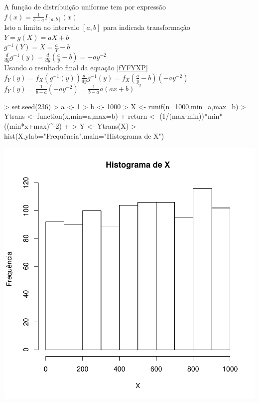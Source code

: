 \documentclass{article}
\begin{document}
  A função de distribuição uniforme tem por expressão\\
  
  $f(x) = \frac{1}{b-a}I_{[a,b]}(x)$\\
  
  Isto a limita ao intervalo $[a,b]$ para indicada transformação\\
  
  $Y = g(X) = aX+b$\\
  
  $g^{-1}(Y) = X = \frac{a}{Y}-b$\\
  
  $\frac{d}{dy}g^{-1}(y) = \frac{d}{dy}(\frac{a}{y}-b) = -ay^{-2}$\\
  
  Usando o resultado final da equação \ref{fYFYXP}\\
  
  $f_Y(y) = f_X(g^{-1}(y))\frac{d}{dy}g^{-1}(y) = f_X(\frac{a}{y}-b)(-ay^{-2})$\\
  
  $f_Y(y) = \frac{1}{b-a}(-ay^{-2}) = \frac{1}{b-a}a(ax+b)^{-2}$
  
\begin{Schunk}
\begin{Sinput}
> set.seed(236)
> a <- 1
> b <- 1000
> X <- runif(n=1000,min=a,max=b)
> Ytrans <- function(x,min=a,max=b){
+   return <- (1/(max-min))*min*((min*x+max)^-2)
+ }
> Y <- Ytrans(X)
> hist(X,ylab="Frequência",main="Histograma de X")
\end{Sinput}
\end{Schunk}
\includegraphics{transformacao-013}
\end{document}
